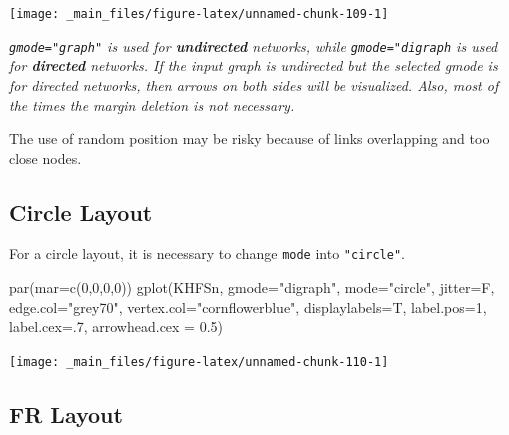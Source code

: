 \documentclass[
  notitlepage,
  onecolumn,
  openany]{book}
\newenvironment{Shaded}{\begin{snugshade}}{\end{snugshade}}
\newcommand{\AttributeTok}[1]{\textcolor[rgb]{0.77,0.63,0.00}{#1}}
\newcommand{\DecValTok}[1]{\textcolor[rgb]{0.00,0.00,0.81}{#1}}
\newcommand{\FloatTok}[1]{\textcolor[rgb]{0.00,0.00,0.81}{#1}}
\newcommand{\FunctionTok}[1]{\textcolor[rgb]{0.00,0.00,0.00}{#1}}
\newcommand{\NormalTok}[1]{#1}
\newcommand{\StringTok}[1]{\textcolor[rgb]{0.31,0.60,0.02}{#1}}
\begin{document}
\begin{center}\texttt{[image: \_main\_files/figure-latex/unnamed-chunk-109-1]} \end{center}

\emph{\texttt{gmode="graph"} is used for \textbf{undirected} networks, while \texttt{gmode="digraph} is used for \textbf{directed} networks. If the input graph is undirected but the selected gmode is for directed networks, then arrows on both sides will be visualized. Also, most of the times the margin deletion is not necessary.}

The use of random position may be risky because of links overlapping and too close nodes.

\hypertarget{circle-layout}{%
\subsection{Circle Layout}\label{circle-layout}}

For a circle layout, it is necessary to change \texttt{mode} into \texttt{"circle"}.

\begin{Shaded}
\begin{Highlighting}[]
\FunctionTok{par}\NormalTok{(}\AttributeTok{mar=}\FunctionTok{c}\NormalTok{(}\DecValTok{0}\NormalTok{,}\DecValTok{0}\NormalTok{,}\DecValTok{0}\NormalTok{,}\DecValTok{0}\NormalTok{))}
\FunctionTok{gplot}\NormalTok{(KHFSn, }
      \AttributeTok{gmode=}\StringTok{"digraph"}\NormalTok{,}
      \AttributeTok{mode=}\StringTok{"circle"}\NormalTok{,}
      \AttributeTok{jitter=}\NormalTok{F,}
      \AttributeTok{edge.col=}\StringTok{"grey70"}\NormalTok{,}
      \AttributeTok{vertex.col=}\StringTok{"cornflowerblue"}\NormalTok{,}
      \AttributeTok{displaylabels=}\NormalTok{T,}
      \AttributeTok{label.pos=}\DecValTok{1}\NormalTok{,}
      \AttributeTok{label.cex=}\NormalTok{.}\DecValTok{7}\NormalTok{,}
      \AttributeTok{arrowhead.cex =} \FloatTok{0.5}\NormalTok{)}
\end{Highlighting}
\end{Shaded}

\begin{center}\texttt{[image: \_main\_files/figure-latex/unnamed-chunk-110-1]} \end{center}

\hypertarget{fr-layout}{%
\subsection{FR Layout}\label{fr-layout}}
\end{document}

